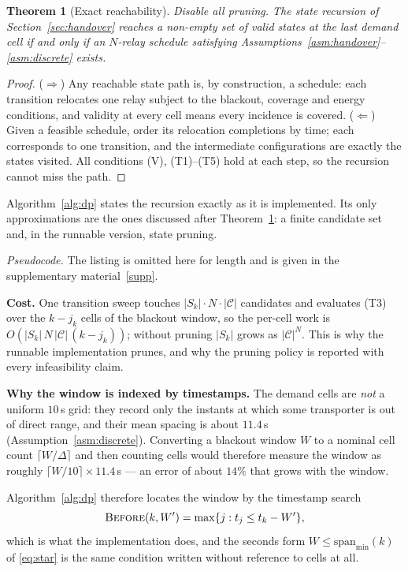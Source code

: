 \documentclass[11pt]{article}
\theoremstyle{dshplain}
\newtheorem{theorem}{Theorem}
\theoremstyle{dshdefn}
\begin{document}
\begin{theorem}[Exact reachability]
\label{thm:exact}
Disable all pruning. The state recursion of Section~\ref{sec:handover} reaches a
non-empty set of valid states at the last demand cell if and only if an
$N$-relay schedule satisfying Assumptions~\ref{asm:handover}--\ref{asm:discrete} exists.
\end{theorem}
\begin{proof}
($\Rightarrow$) Any reachable state path is, by construction, a schedule: each
transition relocates one relay subject to the blackout, coverage and energy
conditions, and validity at every cell means every incidence is covered.
($\Leftarrow$) Given a feasible schedule, order its relocation completions by
time; each corresponds to one transition, and the intermediate configurations
are exactly the states visited. All conditions (V), (T1)--(T5) hold at each
step, so the recursion cannot miss the path.
\end{proof}

Algorithm~\ref{alg:dp} states the recursion exactly as it is implemented.
Its only approximations are the ones discussed after Theorem~\ref{thm:exact}:
a finite candidate set and, in the runnable version, state pruning.

\noindent\emph{Pseudocode.} The listing is omitted here for length and is given in the supplementary material~\ref{supp}.


\noindent\textbf{Cost.} One transition sweep touches $|S_k|\cdot N\cdot|\mathcal{C}|$
candidates and evaluates (T3) over the $k-j_k$ cells of the blackout window, so
the per-cell work is $O(|S_k|\,N\,|\mathcal{C}|\,(k-j_k))$; without pruning
$|S_k|$ grows as $|\mathcal{C}|^{N}$. This is why the runnable implementation
prunes, and why the pruning policy is reported with every infeasibility claim.

{\sloppy\noindent\textbf{Why the window is indexed by timestamps.} The demand cells are
\emph{not} a uniform $10$\,s grid: they record only the instants at which some
transporter is out of direct range, and their mean spacing is about $11.4$\,s
(Assumption~\ref{asm:discrete}). Converting a blackout window $W$ to a nominal
cell count $\lceil W/\Delta\rceil$ and then counting cells would therefore
measure the window as roughly $\lceil W/10\rceil\times 11.4$\,s --- an error of
about $14\%$ that grows with the window.}\par Algorithm~\ref{alg:dp} therefore
locates the window by the timestamp search $$\textsc{Before}(k,W')=\max\{j:
t_j\le t_k-W'\},$$ which is what the implementation does, and the seconds form
$W\le\mathrm{span}_{\min}(k)$ of \eqref{eq:star} is the same condition written
without reference to cells at all.
\end{document}
